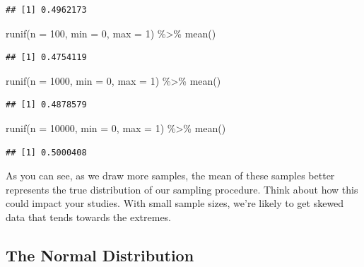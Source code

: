 \documentclass[
]{book}
\newenvironment{Shaded}{\begin{snugshade}}{\end{snugshade}}
\newcommand{\AttributeTok}[1]{\textcolor[rgb]{0.77,0.63,0.00}{#1}}
\newcommand{\DecValTok}[1]{\textcolor[rgb]{0.00,0.00,0.81}{#1}}
\newcommand{\FunctionTok}[1]{\textcolor[rgb]{0.00,0.00,0.00}{#1}}
\newcommand{\NormalTok}[1]{#1}
\newcommand{\SpecialCharTok}[1]{\textcolor[rgb]{0.00,0.00,0.00}{#1}}
\begin{document}
\begin{verbatim}
## [1] 0.4962173
\end{verbatim}

\begin{Shaded}
\begin{Highlighting}[]
\FunctionTok{runif}\NormalTok{(}\AttributeTok{n =} \DecValTok{100}\NormalTok{, }\AttributeTok{min =} \DecValTok{0}\NormalTok{, }\AttributeTok{max =} \DecValTok{1}\NormalTok{) }\SpecialCharTok{\%\textgreater{}\%} \FunctionTok{mean}\NormalTok{()}
\end{Highlighting}
\end{Shaded}

\begin{verbatim}
## [1] 0.4754119
\end{verbatim}

\begin{Shaded}
\begin{Highlighting}[]
\FunctionTok{runif}\NormalTok{(}\AttributeTok{n =} \DecValTok{1000}\NormalTok{, }\AttributeTok{min =} \DecValTok{0}\NormalTok{, }\AttributeTok{max =} \DecValTok{1}\NormalTok{) }\SpecialCharTok{\%\textgreater{}\%} \FunctionTok{mean}\NormalTok{()}
\end{Highlighting}
\end{Shaded}

\begin{verbatim}
## [1] 0.4878579
\end{verbatim}

\begin{Shaded}
\begin{Highlighting}[]
\FunctionTok{runif}\NormalTok{(}\AttributeTok{n =} \DecValTok{10000}\NormalTok{, }\AttributeTok{min =} \DecValTok{0}\NormalTok{, }\AttributeTok{max =} \DecValTok{1}\NormalTok{) }\SpecialCharTok{\%\textgreater{}\%} \FunctionTok{mean}\NormalTok{()}
\end{Highlighting}
\end{Shaded}

\begin{verbatim}
## [1] 0.5000408
\end{verbatim}

As you can see, as we draw more samples, the mean of these samples better represents the true distribution of our sampling procedure. Think about how this could impact your studies. With small sample sizes, we're likely to get skewed data that tends towards the extremes.

\hypertarget{the-normal-distribution}{%
\subsection{The Normal Distribution}\label{the-normal-distribution}}
\end{document}
